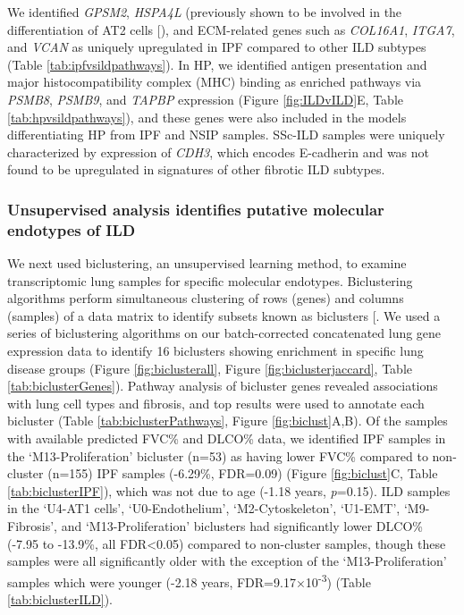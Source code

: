 \documentclass[
]{article}
\begin{document}
We identified \textit{GPSM2}, \textit{HSPA4L} (previously shown to be involved in the differentiation of AT2 cells {[}\citeproc{ref-mohamed_respiratory_2014}{89}{]}), and ECM-related genes such as \textit{COL16A1}, \textit{ITGA7}, and \textit{VCAN} as uniquely upregulated in IPF compared to other ILD subtypes (Table \ref{tab:ipfvsildpathways}). In HP, we identified antigen presentation and major histocompatibility complex (MHC) binding as enriched pathways via \textit{PSMB8}, \textit{PSMB9}, and \textit{TAPBP} expression (Figure \ref{fig:ILDvILD}E, Table \ref{tab:hpvsildpathways}), and these genes were also included in the models differentiating HP from IPF and NSIP samples. SSc-ILD samples were uniquely characterized by expression of \textit{CDH3}, which encodes E-cadherin and was not found to be upregulated in signatures of other fibrotic ILD subtypes.

\subsubsection{Unsupervised analysis identifies putative molecular endotypes of ILD}\label{unsupervised-analysis-identifies-putative-molecular-endotypes-of-ild}

We next used biclustering, an unsupervised learning method, to examine transcriptomic lung samples for specific molecular endotypes. Biclustering algorithms perform simultaneous clustering of rows (genes) and columns (samples) of a data matrix to identify subsets known as biclusters {[}\citeproc{ref-rose_mosbi_2022}{52}{]}. We used a series of biclustering algorithms on our batch-corrected concatenated lung gene expression data to identify 16 biclusters showing enrichment in specific lung disease groups (Figure \ref{fig:biclusterall}, Figure \ref{fig:biclusterjaccard}, Table \ref{tab:biclusterGenes}). Pathway analysis of bicluster genes revealed associations with lung cell types and fibrosis, and top results were used to annotate each bicluster (Table \ref{tab:biclusterPathways}, Figure \ref{fig:biclust}A,B). Of the samples with available predicted FVC\% and DLCO\% data, we identified IPF samples in the `M13-Proliferation' bicluster (n=53) as having lower FVC\% compared to non-cluster (n=155) IPF samples (-6.29\%, FDR=0.09) (Figure \ref{fig:biclust}C, Table \ref{tab:biclusterIPF}), which was not due to age (-1.18 years, \textit{p}=0.15). ILD samples in the `U4-AT1 cells', `U0-Endothelium', `M2-Cytoskeleton', `U1-EMT', `M9-Fibrosis', and `M13-Proliferation' biclusters had significantly lower DLCO\% (-7.95 to -13.9\%, all FDR\textless0.05) compared to non-cluster samples, though these samples were all significantly older with the exception of the `M13-Proliferation' samples which were younger (-2.18 years, FDR=9.17×10\textsuperscript{-3}) (Table \ref{tab:biclusterILD}).
\end{document}
